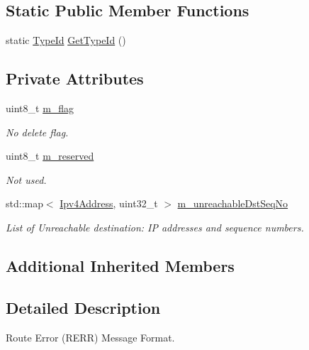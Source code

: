 \subsection*{Static Public Member Functions}
\begin{DoxyCompactItemize}
\item 
static \hyperlink{classns3_1_1TypeId}{Type\+Id} \hyperlink{classns3_1_1aodv_1_1RerrHeader_a157ea3445eb80678db23a667e7a6bb6e}{Get\+Type\+Id} ()
\end{DoxyCompactItemize}
\subsection*{Private Attributes}
\begin{DoxyCompactItemize}
\item 
uint8\+\_\+t \hyperlink{classns3_1_1aodv_1_1RerrHeader_a5900f88da998f757a35580842ed00fff}{m\+\_\+flag}
\begin{DoxyCompactList}\small\item\em No delete flag. \end{DoxyCompactList}\item 
uint8\+\_\+t \hyperlink{classns3_1_1aodv_1_1RerrHeader_a33e4820f7cd4d2bac9ec3776e6edaeb3}{m\+\_\+reserved}
\begin{DoxyCompactList}\small\item\em Not used. \end{DoxyCompactList}\item 
std\+::map$<$ \hyperlink{classns3_1_1Ipv4Address}{Ipv4\+Address}, uint32\+\_\+t $>$ \hyperlink{classns3_1_1aodv_1_1RerrHeader_aac0c151289da2fbe168bf5550c492bd5}{m\+\_\+unreachable\+Dst\+Seq\+No}
\begin{DoxyCompactList}\small\item\em List of Unreachable destination\+: IP addresses and sequence numbers. \end{DoxyCompactList}\end{DoxyCompactItemize}
\subsection*{Additional Inherited Members}


\subsection{Detailed Description}
Route Error (R\+E\+RR) Message Format. 

